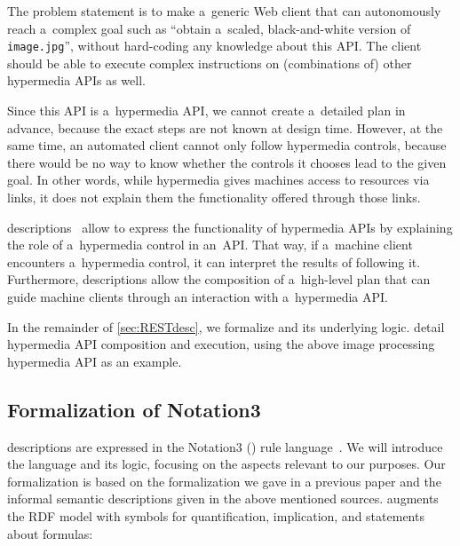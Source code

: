 The problem statement is to make a~generic Web client
that can autonomously reach a~complex goal such as
``obtain a~scaled, black-and-white version of \verb!image.jpg!'',
without hard-coding any knowledge about this API.
The client should be able to execute complex instructions
on (combinations of) other hypermedia APIs as well.

Since this API is a~hypermedia API,
we cannot create a~detailed plan in advance,
because the exact steps are not known at design time.
However, at the same time,
an automated client cannot only follow hypermedia controls,
because there would be no way to know
whether the controls it chooses lead to the given goal.
In other words,
while hypermedia gives machines access to resources via links,
it does not explain them the functionality offered through those links.

\restdesc descriptions~\cite{verborgh_wsrest_2012,verborgh_mtap_2013}
allow to express the functionality of hypermedia APIs
by explaining the role of a~hypermedia control in an~API.
That way, if a~machine client encounters a~hypermedia control,
it can interpret the results of following it.
Furthermore, \restdesc descriptions allow the composition of a~high-level plan
that can guide machine clients through an interaction with a~hypermedia API.

In the remainder of \cref{sec:RESTdesc},
we formalize \restdesc and its underlying \nthree logic.
 detail hypermedia API composition and execution,
using the above image processing hypermedia API as an example.


\subsection{Formalization of Notation3}
\label{nthree}


\restdesc descriptions are expressed in the Notation3 (\nthree) rule language~\cite{N3Logic,Notation3}.
We will introduce the \nthree language and its logic,
focusing on the aspects relevant to our purposes. Our formalization is based on the formalization we gave in a previous paper \cite{semN3} and the informal
semantic descriptions given in the above mentioned sources.
\nthree augments the RDF model with symbols for quantification, implication, and statements about formulas:


